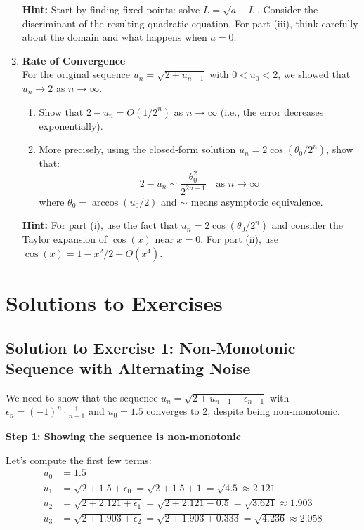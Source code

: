 \documentclass[12pt,a4paper]{article}
\theoremstyle{definition}
\begin{document}
\begin{enumerate}
    \textbf{Hint:} Start by finding fixed points: solve $L = \sqrt{a + L}$. Consider the discriminant of the resulting quadratic equation. For part (iii), think carefully about the domain and what happens when $a = 0$.
    
    \item \textbf{Rate of Convergence}\\
    For the original sequence $u_n = \sqrt{2 + u_{n-1}}$ with $0 < u_0 < 2$, we showed that $u_n \to 2$ as $n \to \infty$. 
    \begin{enumerate}[label=\roman*)]
        \item Show that $2 - u_n = O(1/2^n)$ as $n \to \infty$ (i.e., the error decreases exponentially).
        \item More precisely, using the closed-form solution $u_n = 2\cos(\theta_0/2^n)$, show that:
        \[
        2 - u_n \sim \frac{\theta_0^2}{2^{2n+1}} \quad \text{as } n \to \infty
        \]
        where $\theta_0 = \arccos(u_0/2)$ and $\sim$ means asymptotic equivalence.
    \end{enumerate}
    
    \textbf{Hint:} For part (i), use the fact that $u_n = 2\cos(\theta_0/2^n)$ and consider the Taylor expansion of $\cos(x)$ near $x = 0$. For part (ii), use $\cos(x) = 1 - x^2/2 + O(x^4)$.
\end{enumerate}

\newpage

\section{Solutions to Exercises}

\subsection{Solution to Exercise 1: Non-Monotonic Sequence with Alternating Noise}

We need to show that the sequence $u_n = \sqrt{2 + u_{n-1} + \epsilon_{n-1}}$ with $\epsilon_n = (-1)^n \cdot \frac{1}{n+1}$ and $u_0 = 1.5$ converges to 2, despite being non-monotonic.

\textbf{Step 1: Showing the sequence is non-monotonic}

Let's compute the first few terms:
\begin{align*}
u_0 &= 1.5\\
u_1 &= \sqrt{2 + 1.5 + \epsilon_0} = \sqrt{2 + 1.5 + 1} = \sqrt{4.5} \approx 2.121\\
u_2 &= \sqrt{2 + 2.121 + \epsilon_1} = \sqrt{2 + 2.121 - 0.5} = \sqrt{3.621} \approx 1.903\\
u_3 &= \sqrt{2 + 1.903 + \epsilon_2} = \sqrt{2 + 1.903 + 0.333} = \sqrt{4.236} \approx 2.058
\end{align*}
\end{document}
